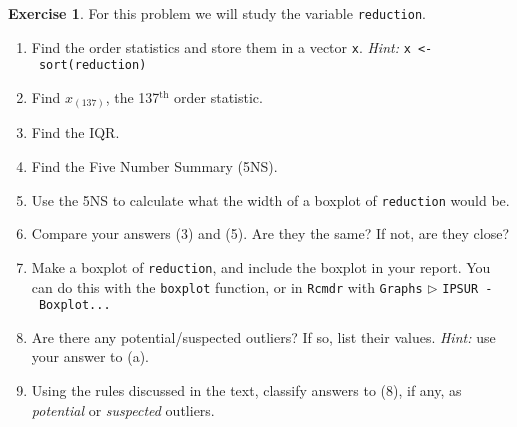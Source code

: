 \documentclass[]{book}
\providecommand{\tightlist}{%
  \setlength{\itemsep}{0pt}\setlength{\parskip}{0pt}}
\numberwithin{equation}{chapter}
\numberwithin{figure}{chapter}
\theoremstyle{plain}
\theoremstyle{definition}
\newtheorem{xca}{Exercise}[chapter]
\theoremstyle{remark}
\theoremstyle{definition}
\theoremstyle{definition}
\theoremstyle{remark}
\begin{document}
\begin{xca}
For this problem we will study the variable \texttt{reduction}.

\begin{enumerate}
\def\labelenumi{\arabic{enumi}.}
\tightlist
\item
  Find the order statistics and store them in a vector \texttt{x}.
  \emph{Hint:} \texttt{x\ \textless{}-\ sort(reduction)}
\item
  Find \(x_{(137)}\), the 137\(^{\mathrm{th}}\) order statistic.
\item
  Find the IQR.
\item
  Find the Five Number Summary (5NS).
\item
  Use the 5NS to calculate what the width of a boxplot of
  \texttt{reduction} would be.
\item
  Compare your answers (3) and (5). Are they the same? If not, are they
  close?
\item
  Make a boxplot of \texttt{reduction}, and include the boxplot in your
  report. You can do this with the \texttt{boxplot} function, or in
  \texttt{Rcmdr} with \texttt{Graphs} \(\triangleright\)
  \texttt{IPSUR\ -\ Boxplot...}
\item
  Are there any potential/suspected outliers? If so, list their values.
  \emph{Hint:} use your answer to (a).
\item
  Using the rules discussed in the text, classify answers to (8), if
  any, as \emph{potential} or \emph{suspected} outliers.
\end{enumerate}
\end{xca}

\bigskip
\end{document}
